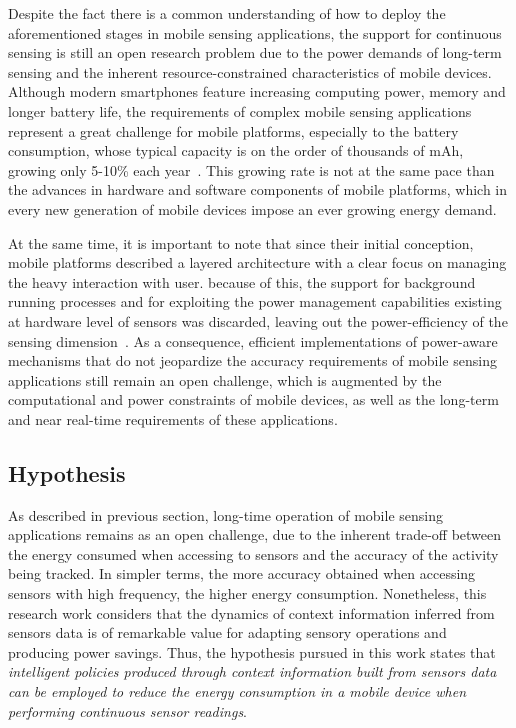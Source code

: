 \documentclass[ENG,PhD]{cinvestav}
\begin{document}
Despite the fact there is a common understanding of how to deploy the aforementioned stages in mobile sensing applications, the support for continuous sensing is still an open research problem due to the power demands of long-term sensing and the inherent resource-constrained characteristics of mobile devices.
Although modern smartphones feature increasing computing power, memory and longer battery life, the requirements of complex mobile sensing applications represent a great challenge for mobile platforms, especially to the battery consumption, whose typical capacity is on the order of thousands of mAh, growing only 5-10\% each year~\cite{Ma2012,Evarts2015}. 
This growing rate is not at the same pace than the advances in hardware and software components of mobile platforms, which in every new generation of mobile devices impose an ever growing energy demand.

At the same time, it is important to note that since their initial conception, mobile platforms described a layered architecture with a clear focus on managing the heavy interaction with user.
because of this, the support for background running processes and for exploiting the power management capabilities existing at hardware level of sensors was discarded, leaving out the power-efficiency of the sensing dimension~\cite{Priyantha2011}.
As a consequence, efficient implementations of power-aware mechanisms that do not jeopardize the accuracy requirements of mobile sensing applications still remain an open challenge, which is augmented by the computational and power constraints of mobile devices, as well as the long-term and near real-time requirements of these applications.


\subsection{Hypothesis} 
\label{sub:hypothesis}
As described in previous section, long-time operation of mobile sensing applications remains as an open challenge, due to the inherent trade-off between the energy consumed when accessing to sensors and the accuracy of the activity being tracked.
In simpler terms, the more accuracy obtained when accessing sensors with high frequency, the higher energy consumption.
Nonetheless, this research work considers that the dynamics of context information inferred from sensors data is of remarkable value for adapting sensory operations and producing power savings.
Thus, the hypothesis pursued in this work states that \emph{intelligent policies produced through context information built from sensors data can be employed to reduce the energy consumption in a mobile device when performing continuous sensor readings}.
\end{document}
